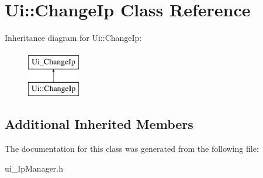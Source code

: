 \hypertarget{class_ui_1_1_change_ip}{\section{Ui\-:\-:Change\-Ip Class Reference}
\label{class_ui_1_1_change_ip}
}
Inheritance diagram for Ui\-:\-:Change\-Ip\-:\begin{figure}[H]
\begin{center}
\leavevmode
\includegraphics[height=2.000000cm]{class_ui_1_1_change_ip}
\end{center}
\end{figure}
\subsection*{Additional Inherited Members}


The documentation for this class was generated from the following file\-:\begin{DoxyCompactItemize}
\item 
ui\-\_\-\-Ip\-Manager.\-h\end{DoxyCompactItemize}
